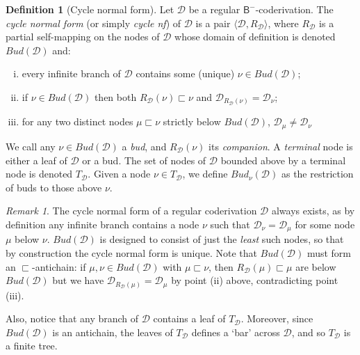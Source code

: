 \documentclass[manuscript,screen]{acmart}
\newcommand{\red}[1]{{\color{red}#1}}
\newcommand{\anupam}[1]{\todo{A: #1}}
\theoremstyle{definition}
\newtheorem{defn}[thm]{Definition}
\theoremstyle{remark}
\newtheorem{rem}[thm]{Remark}
\newcommand{\bc}{\mathsf{B}}
\newcommand{\bcnorec}{\bc^{-}}
\newcommand{\der}{\mathcal{D}}
\newcommand{\pder}[1]{\der_{#1}}
\newcommand{\rd}{{R}_\der}
\newcommand{\derrd}{\langle \der, \rd \rangle}
\newcommand{\bud}{\mathit{Bud}}
\begin{document}
\begin{defn}[Cycle normal form]
Let $\der$ be a regular $\bcnorec$-coderivation. 
The  \emph{cycle normal form} (or simply \emph{cycle nf}) of $\der$ is a pair $\derrd$, where  $\rd$ is a partial self-mapping on the nodes of $\der$ whose domain of definition is denoted $\bud(\der)$ and:
\begin{enumerate}[(i)]
    \item every infinite branch of $\der$ contains some (unique) $\nu \in \bud(\der)$;
    \item if $\nu \in \bud(\der)$ then both $\rd(\nu) \sqsubset \nu$ and  $\der_{\rd(\nu)} = \der_\nu$;
    \item for any two distinct nodes $\mu \sqsubset \nu$ strictly below $\bud(\der)$, $\der_\mu \neq \der_\nu$
\end{enumerate}

We call any $\nu \in \bud(\der)$ a \emph{bud}, and $\rd(\nu)$ its \emph{companion}. A \emph{terminal} node is either a leaf of $\der$ or a bud. The set of nodes of $\der$ bounded above by a terminal node is denoted $T_\der$.  
Given a node $\nu\in T_\der$, we  define $\bud_\nu(\der)$ as the restriction of buds to those above $\nu$.
\end{defn}

\begin{rem}\label{rem:canonicalnodesfinite}
The cycle normal form of a regular coderivation $\der$ always exists, as  by definition any infinite branch contains a node $\nu$ such that $\pder \nu=\pder \mu$ for some node $\mu$ below $\nu$. 
$\bud(\der)$ is designed to consist of just the \emph{least} such nodes, so that by construction the  cycle normal form is unique. 
Note that $\bud(\der)$ must form an $\sqsubset$-antichain: if $\mu, \nu \in \bud(\der)$ with $\mu\sqsubset \nu$, then $\rd(\mu)\sqsubset \mu $ are below $\bud(\der)$ but we have $\der_{\rd(\mu)} = \der_\mu$ by point (ii) above, contradicting point (iii). 

Also, notice that any branch of $\der$ contains a leaf of $T_\der$. Moreover, since $\bud(\der)$ is an antichain, the leaves of $T_\der$ defines a ‘bar’ across  $\der$,
and so $T_\der$ is a finite tree. 
\end{rem}
\end{document}

